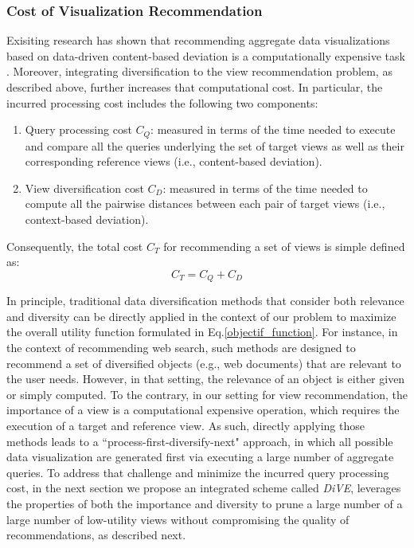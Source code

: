 \subsubsection{Cost of Visualization Recommendation}

Exisiting research has shown that recommending aggregate data visualizations based on data-driven content-based deviation is a computationally expensive task \cite{Vartak2014, Vartak2015, Ehsan2016}.
%
Moreover, integrating diversification to the view recommendation problem, as described above, further increases that computational cost.
%
In particular, the incurred processing cost includes the following two components:

\begin{enumerate}
	\item Query processing cost $C_Q$: measured in terms of the time needed to execute and compare all the queries underlying the set of target views as well as their corresponding reference views (i.e., content-based deviation).
	
	\item View diversification cost $C_D$: measured in terms of the time needed to compute all the pairwise distances between each pair of target views (i.e., context-based deviation).
	
\end{enumerate}

Consequently, the total cost $C_T$ for recommending a set of views is simple defined as:
\[
C_T= C_Q + C_D
\]

In principle, traditional data diversification methods that consider both relevance and diversity can be directly applied in the context of our problem to maximize the overall utility function formulated in Eq.\ref{objectif_function}.
%
For instance, in the context of recommending web search, such methods are designed to recommend a set of diversified objects (e.g., web documents) that are relevant to the user needs. 
%
However, in that setting, the relevance of an object is either given or simply computed.
%
To the contrary, in our setting for view recommendation, the importance of a view is a computational expensive operation, which requires the execution of a target and reference view. 
%
As such, directly applying those methods leads to a ``process-first-diversify-next" approach, in which all possible data visualization are generated first via executing a large number of aggregate queries. 
%
To address that challenge and minimize the incurred query processing cost, in the next section we propose an integrated scheme called {\em DiVE}, leverages the properties of both the importance and diversity to prune a large number of a large number of low-utility views without compromising the quality of recommendations, as described next.

